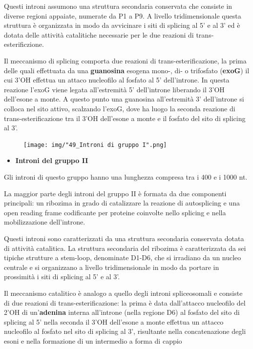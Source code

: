 \documentclass[11pt]{book}
\begin{document}
Questi introni assumono una struttura secondaria conservata che consiste
in diverse regioni appaiate, numerate da P1 a P9. A livello
tridimensionale questa struttura è organizzata in modo da avvicinare i
siti di splicing al 5' e al 3' ed è dotata delle attività catalitiche
necessarie per le due reazioni di trans-esterificzione.

Il meccanismo di splicing comporta due reazioni di
trans-esterificazione, la prima delle quali effettuata da una
\textbf{guanosina} esogena mono-, di- o trifosfato (\textbf{exoG}) il
cui 3'OH effettua un attaco nucleofilo al fosfato al 5' dell'introne. In
questa reazione l'exoG viene legata all'estremità 5' dell'introne
liberando il 3'OH dell'esone a monte. A questo punto una guanosina
all'estremità 3' dell'introne si colloca nel sito attivo, scalzando
l'exoG, dove ha luogo la seconda reazione di trans-esterificazione tra
il 3'OH dell'esone a monte e il fosfato del sito di splicing al 3'.

\begin{figure}[htp]
\centering
\texttt{[image: img/"49\_Introni di gruppo I".png]}
\caption{}
\label{introni-di-gruppo-i}
\end{figure}

\begin{itemize}
\itemsep1pt\parskip0pt
\item
  \textbf{Introni del gruppo II}
\end{itemize}

Gli introni di questo gruppo hanno una lunghezza compresa tra i 400 e i
1000 nt.

La maggior parte degli introni del gruppo II è formata da due componenti
principali: un ribozima in grado di catalizzare la reazione di
autosplicing e una open reading frame codificante per proteine coinvolte
nello splicing e nella mobilizzazione dell'introne.

Questi introni sono caratterizzati da una struttura secondaria
conservata dotata di attività catalitica. La struttura secondaria del
ribozima è caratterizzata da sei tipiche strutture a stem-loop,
denominate D1-D6, che si irradiano da un nucleo centrale e si
organizzano a livello tridimensionale in modo da portare in prossimità i
siti di splicing al 5' e al 3'.

Il meccanismo catalitico è analogo a quello degli introni spliceosomali
e consiste di due reazioni di trans-esterificazione: la prima è data
dall'attacco nucleofilo del 2'OH di un'\textbf{adenina} interna
all'introne (nella regione D6) al fosfato del sito di splicing al 5'
nella seconda il 3'OH dell'esone a monte effettua un attacco nucleofilo
al fosfato nel sito di splicing al 3', risultante nella concatenazione
degli esoni e nella formazione di un intermedio a forma di cappio
\end{document}
